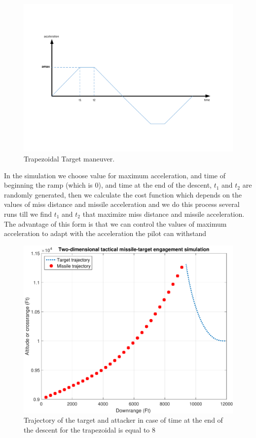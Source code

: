 \begin{figure}[htb]
	\centering
	\includegraphics[scale = 0.75]{fig/trapezoidalacc.pdf}
	\caption{Trapezoidal Target maneuver.}
	\label{trapezoidalacc}
\end{figure}
In the simulation we choose value for maximum acceleration, and time of beginning the ramp (which is 0), and time at the end of the descent, $t_1$ and $t_2$ are randomly generated, then we calculate the cost function which depends on the values of miss distance and missile acceleration and we do this process several runs till we find $t_1$ and $t_2$ that maximize miss distance and missile acceleration.   
The advantage of this form is that we can control the values of maximum acceleration to adapt with the acceleration the pilot can withstand

\begin{figure}[htb]
	\centering
	\includegraphics[scale = 0.75]{fig/trajectoryT1.pdf}
	\caption{Trajectory of the target and attacker in case of time at the end of the descent for the trapezoidal is equal to 8 }
	\label{trajectoryT1}
\end{figure}


